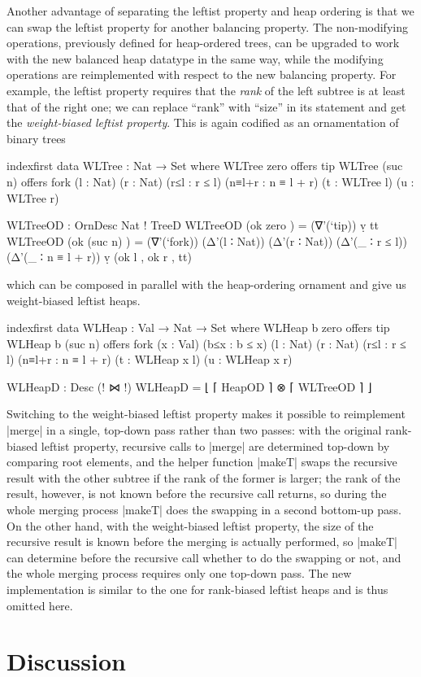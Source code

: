 Another advantage of separating the leftist property and heap ordering is that we can swap the leftist property for another balancing property.
The non-modifying operations, previously defined for heap-ordered trees, can be upgraded to work with the new balanced heap datatype in the same way, while the modifying operations are reimplemented with respect to the new balancing property.
For example, the leftist property requires that the \emph{rank} of the left subtree is at least that of the right one; we can replace ``rank'' with ``size'' in its statement and get the \emph{weight-biased leftist property}.
This is again codified as an ornamentation of binary trees
\begin{code}
indexfirst data WLTree : Nat → Set where
  WLTree zero     offers   tip
  WLTree (suc n)  offers   fork  (l : Nat) (r : Nat)
                                 (r≤l : r ≤ l) (n≡l+r : n ≡ l + r)
                                 (t : WLTree l) (u : WLTree r)

WLTreeOD : OrnDesc Nat ! TreeD
WLTreeOD (ok zero     )  =  (∇'(`tip)) ṿ tt
WLTreeOD (ok (suc n)  )  =  (∇'(`fork)) (Δ'(l ∶ Nat)) (Δ'(r ∶ Nat))
                              (Δ'(_ ∶ r ≤ l)) (Δ'(_ ∶ n ≡ l + r)) ṿ (ok l , ok r , tt)
\end{code}
which can be composed in parallel with the heap-ordering ornament and give us weight-biased leftist heaps.
\begin{code}
indexfirst data WLHeap : Val → Nat → Set where
  WLHeap b zero     offers  tip
  WLHeap b (suc n)  offers  fork  (x : Val) (b≤x : b ≤ x)
                                  (l : Nat) (r : Nat)
                                  (r≤l : r ≤ l) (n≡l+r : n ≡ l + r)
                                  (t : WLHeap x l) (u : WLHeap x r)

WLHeapD : Desc (! ⋈ !)
WLHeapD = ⌊ ⌈ HeapOD ⌉ ⊗ ⌈ WLTreeOD ⌉ ⌋
\end{code}
Switching to the weight-biased leftist property makes it possible to reimplement |merge| in a single, top-down pass rather than two passes: with the original rank-biased leftist property, recursive calls to |merge| are determined top-down by comparing root elements, and the helper function |makeT| swaps the recursive result with the other subtree if the rank of the former is larger; the rank of the result, however, is not known before the recursive call returns, so during the whole merging process |makeT| does the swapping in a second bottom-up pass.
On the other hand, with the weight-biased leftist property, the size of the recursive result is known before the merging is actually performed, so |makeT| can determine before the recursive call whether to do the swapping or not, and the whole merging process requires only one top-down pass.
The new implementation is similar to the one for rank-biased leftist heaps and is thus omitted here.

\section{Discussion}


